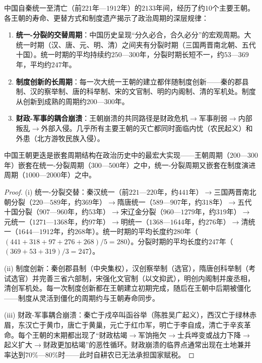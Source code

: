 \begin{theorem}[中国王朝更迭的周期规律]\label{thm:chinese_dynasty_cycle}
中国自秦统一至清亡（前$221$年—$1912$年）的$2133$年间，经历了约$10$个主要王朝。各王朝的寿命、更替方式和制度遗产揭示了政治周期的深层规律：
\begin{enumerate}[label=(\roman*)]
    \item \textbf{统一-分裂的交替周期}：中国历史呈现“分久必合，合久必分”的宏观周期。大统一时期（汉、唐、元、明、清）之间夹有分裂时期（三国两晋南北朝、五代十国）。统一时期的平均持续约$250$—$300$年，分裂时期长短不一，约$53$—$369$年，平均约$247$年。
    \item \textbf{制度创新的长周期}：每一次大统一王朝的建立都伴随制度创新——秦的郡县制、汉的察举制、唐的科举制、宋的文官制、明的内阁制、清的军机处。制度从创新到成熟的周期约$200$—$300$年。
    \item \textbf{财政-军事的耦合崩溃}：王朝崩溃的共同路径是财政危机$\to$军事削弱$\to$内部叛乱$\to$外部入侵。几乎所有主要王朝的灭亡都同时面临内忧（农民起义）和外患（北方游牧民族入侵）。
\end{enumerate}
中国王朝更迭是嵌套周期结构在政治历史中的最宏大实现——王朝周期（$200$—$300$年）嵌套在统一-分裂周期（$300$—$500$年）之中，统一-分裂周期又嵌套在制度演进周期（$1000$—$2000$年）之中。
\end{theorem}

\begin{proof}
(i) 统一-分裂交替：秦汉统一（前$221$—$220$年，约$441$年）$\to$三国两晋南北朝分裂（$220$—$589$年，约$369$年）$\to$隋唐统一（$589$—$907$年，约$318$年）$\to$五代十国分裂（$907$—$960$年，约$53$年）$\to$宋辽金分裂（$960$—$1279$年，约$319$年）$\to$元统一（$1271$—$1368$年，约$97$年）$\to$明统一（$1368$—$1644$年，约$276$年）$\to$清统一（$1644$—$1912$年，约$268$年）。统一时期的平均长度约$280$年（$(441+318+97+276+268)/5=280$）。分裂时期的平均长度约$247$年（$(369+53+319)/3=247$）。

(ii) 制度创新：秦创郡县制（中央集权），汉创察举制（选官），隋唐创科举制（考试选官）并完善三省六部制，宋强化文官制（以文抑武），明创内阁制并废丞相，清创军机处。每一次制度创新都在王朝建立初期完成，随后在王朝中后期被僵化——制度从灵活到僵化的周期约与王朝寿命同步。

(iii) 财政-军事耦合崩溃：秦亡于戍卒叫函谷举（陈胜吴广起义），西汉亡于绿林赤眉，东汉亡于黄巾，唐亡于黄巢，元亡于红巾军，明亡于李自成，清亡于辛亥革命。每个王朝的末期都出现了“财政枯竭$\to$军饷拖欠$\to$士兵哗变或战力下降$\to$起义扩大$\to$财政更加枯竭”的恶性循环。财政崩溃的临界点通常出现在土地兼并率达到$70\%$—$80\%$时——此时自耕农已无法承担国家赋税。
\end{proof}


